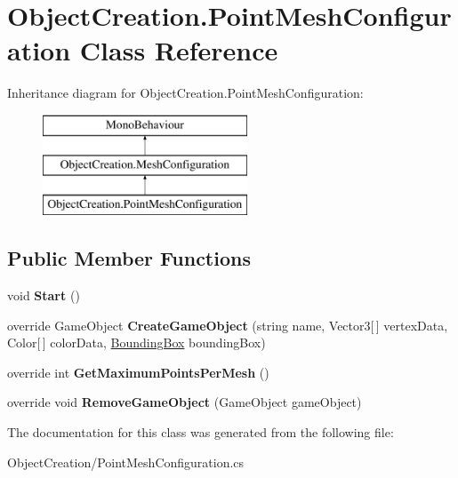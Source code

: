 \hypertarget{class_object_creation_1_1_point_mesh_configuration}{}\section{Object\+Creation.\+Point\+Mesh\+Configuration Class Reference}
\label{class_object_creation_1_1_point_mesh_configuration}
Inheritance diagram for Object\+Creation.\+Point\+Mesh\+Configuration\+:\begin{figure}[H]
\begin{center}
\leavevmode
\includegraphics[height=3.000000cm]{class_object_creation_1_1_point_mesh_configuration}
\end{center}
\end{figure}
\subsection*{Public Member Functions}
\begin{DoxyCompactItemize}
\item 
\mbox{\label{class_object_creation_1_1_point_mesh_configuration_ad910bfac398c68f9b65103df5de9f9ec}} 
void {\bfseries Start} ()
\item 
\mbox{\label{class_object_creation_1_1_point_mesh_configuration_a9bf5872344d3848dc39b9287396d4bd8}} 
override Game\+Object {\bfseries Create\+Game\+Object} (string name, Vector3\mbox{[}$\,$\mbox{]} vertex\+Data, Color\mbox{[}$\,$\mbox{]} color\+Data, \hyperlink{class_cloud_data_1_1_bounding_box}{Bounding\+Box} bounding\+Box)
\item 
\mbox{\label{class_object_creation_1_1_point_mesh_configuration_a52ff0f63947113009274de7e815f472a}} 
override int {\bfseries Get\+Maximum\+Points\+Per\+Mesh} ()
\item 
\mbox{\label{class_object_creation_1_1_point_mesh_configuration_aa8b986ffcec27061b4277605b2641aca}} 
override void {\bfseries Remove\+Game\+Object} (Game\+Object game\+Object)
\end{DoxyCompactItemize}


The documentation for this class was generated from the following file\+:\begin{DoxyCompactItemize}
\item 
Object\+Creation/Point\+Mesh\+Configuration.\+cs\end{DoxyCompactItemize}

